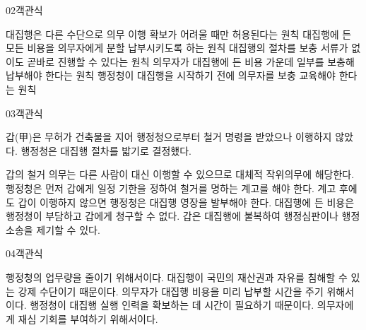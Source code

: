 \documentclass[fs85,seriesWit]{korfarm-base}
\begin{document}
\begin{kfQBlock}{02}{객관식}
\begin{kfChoices}
\kfChoice 대집행은 다른 수단으로 의무 이행 확보가 어려울 때만 허용된다는 원칙
\kfChoice 대집행에 든 모든 비용을 의무자에게 분할 납부시키도록 하는 원칙
\kfChoice 대집행의 절차를 보충 서류가 없이도 곧바로 진행할 수 있다는 원칙
\kfChoice 의무자가 대집행에 든 비용 가운데 일부를 보충해 납부해야 한다는 원칙
\kfChoice 행정청이 대집행을 시작하기 전에 의무자를 보충 교육해야 한다는 원칙
\end{kfChoices}
\end{kfQBlock}

\begin{kfQBlock}{03}{객관식}
\begin{kfEvidence}갑(甲)은 무허가 건축물을 지어 행정청으로부터 철거 명령을 받았으나 이행하지 않았다. 행정청은 대집행 절차를 밟기로 결정했다.\end{kfEvidence}
\begin{kfChoices}
\kfChoice 갑의 철거 의무는 다른 사람이 대신 이행할 수 있으므로 대체적 작위의무에 해당한다.
\kfChoice 행정청은 먼저 갑에게 일정 기한을 정하여 철거를 명하는 계고를 해야 한다.
\kfChoice 계고 후에도 갑이 이행하지 않으면 행정청은 대집행 영장을 발부해야 한다.
\kfChoice 대집행에 든 비용은 행정청이 부담하고 갑에게 청구할 수 없다.
\kfChoice 갑은 대집행에 불복하여 행정심판이나 행정소송을 제기할 수 있다.
\end{kfChoices}
\end{kfQBlock}

\begin{kfQBlock}{04}{객관식}
\begin{kfChoices}
\kfChoice 행정청의 업무량을 줄이기 위해서이다.
\kfChoice 대집행이 국민의 재산권과 자유를 침해할 수 있는 강제 수단이기 때문이다.
\kfChoice 의무자가 대집행 비용을 미리 납부할 시간을 주기 위해서이다.
\kfChoice 행정청이 대집행 실행 인력을 확보하는 데 시간이 필요하기 때문이다.
\kfChoice 의무자에게 재심 기회를 부여하기 위해서이다.
\end{kfChoices}
\end{kfQBlock}

\kfEndMC
\end{document}
